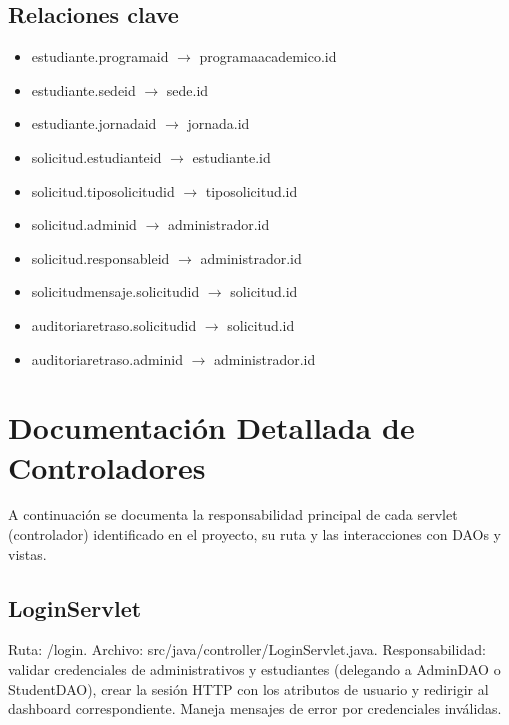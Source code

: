 \documentclass[12pt,letterpaper]{article}
\newcommand{\code}[1]{\texorpdfstring{\begingroup\normalfont\normalsize\def\_{\textunderscore\allowbreak}#1\endgroup}{#1}}
\begin{document}
\subsection{Relaciones clave}

\begin{itemize}
    \item \code{estudiante.programa\_id} $\rightarrow$ \code{programa\_academico.id}
    \item \code{estudiante.sede\_id} $\rightarrow$ \code{sede.id}
    \item \code{estudiante.jornada\_id} $\rightarrow$ \code{jornada.id}
    \item \code{solicitud.estudiante\_id} $\rightarrow$ \code{estudiante.id}
    \item \code{solicitud.tipo\_solicitud\_id} $\rightarrow$ \code{tipo\_solicitud.id}
    \item \code{solicitud.admin\_id} $\rightarrow$ \code{administrador.id}
    \item \code{solicitud.responsable\_id} $\rightarrow$ \code{administrador.id}
    \item \code{solicitud\_mensaje.solicitud\_id} $\rightarrow$ \code{solicitud.id}
    \item \code{auditoria\_retraso.solicitud\_id} $\rightarrow$ \code{solicitud.id}
    \item \code{auditoria\_retraso.admin\_id} $\rightarrow$ \code{administrador.id}
\end{itemize}

\section{Documentación Detallada de Controladores}

A continuación se documenta la responsabilidad principal de cada servlet (controlador) identificado en el proyecto, su ruta y las interacciones con DAOs y vistas.

\subsection*{LoginServlet}
Ruta: \code{/login}. Archivo: \code{src/java/controller/LoginServlet.java}.
Responsabilidad: validar credenciales de administrativos y estudiantes (delegando a \code{AdminDAO} o \code{StudentDAO}), crear la sesión HTTP con los atributos de usuario y redirigir al dashboard correspondiente. Maneja mensajes de error por credenciales inválidas.
\end{document}
